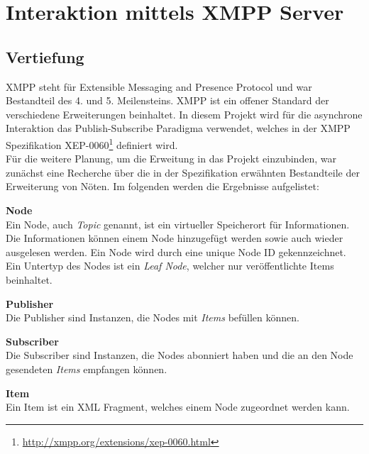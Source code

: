 
\section{Interaktion mittels XMPP Server}

\subsection{Vertiefung}

XMPP steht für Extensible Messaging and Presence Protocol und war Bestandteil des 4. und 5. Meilensteins. XMPP ist ein offener Standard der verschiedene Erweiterungen beinhaltet. In diesem Projekt wird für die asynchrone Interaktion das Publish-Subscribe Paradigma verwendet, welches in der XMPP Spezifikation XEP-0060\footnote{\url{http://xmpp.org/extensions/xep-0060.html}} definiert wird.\\

Für die weitere Planung, um die Erweitung in das Projekt einzubinden, war zunächst eine Recherche über die in der Spezifikation erwähnten Bestandteile der Erweiterung von Nöten. Im folgenden werden die Ergebnisse aufgelistet:

\vspace{0.2cm}

\textbf{Node}\\
Ein Node, auch \textit{Topic} genannt, ist ein virtueller Speicherort für Informationen. Die Informationen können einem Node hinzugefügt werden sowie auch wieder ausgelesen werden. Ein Node wird durch eine unique Node ID gekennzeichnet.\\
Ein Untertyp des Nodes ist ein \textit{Leaf Node}, welcher nur veröffentlichte Items beinhaltet.

\vspace{0.2cm}

\textbf{Publisher}\\
Die Publisher sind Instanzen, die Nodes mit \textit{Items} befüllen können.

\vspace{0.2cm}

\textbf{Subscriber}\\
Die Subscriber sind Instanzen, die Nodes abonniert haben und die an den Node gesendeten \textit{Items} empfangen können.

\vspace{0.2cm}

\textbf{Item}\\
Ein Item ist ein XML Fragment, welches einem Node zugeordnet werden kann.

